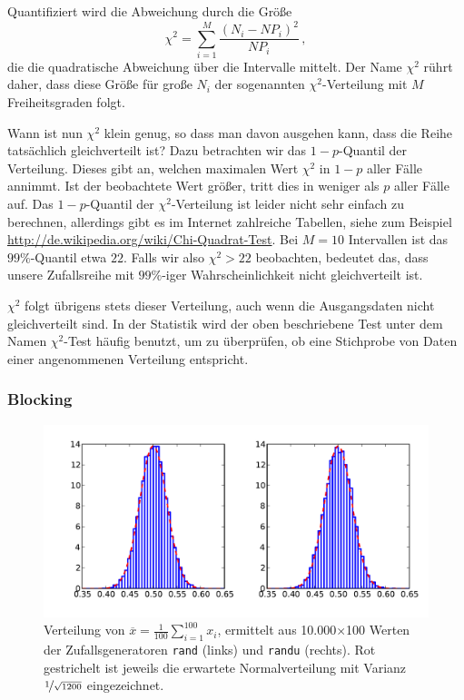 Quantifiziert wird die Abweichung durch die Größe
\begin{equation}
	\chi^2 = \sum_{i=1}^M\frac{(N_i - N P_i)^2}{N P_i}\,,
\end{equation}
die die quadratische Abweichung über die Intervalle mittelt. Der Name $\chi^2$ rührt daher, dass diese Größe für große $N_i$ der sogenannten $\chi^2$-Verteilung mit $M$ Freiheitsgraden folgt.

Wann ist nun $\chi^2$ klein genug, so dass man davon ausgehen kann, dass die Reihe tatsächlich gleichverteilt ist? Dazu betrachten wir das $1-p$-Quantil der Verteilung. Dieses gibt an, welchen maximalen Wert $\chi^2$ in $1-p$ aller Fälle annimmt. Ist der beobachtete Wert größer, tritt dies in weniger als $p$ aller Fälle auf. Das $1-p$-Quantil der $\chi^2$-Verteilung ist leider nicht sehr einfach zu berechnen, allerdings gibt es im Internet zahlreiche Tabellen, siehe zum Beispiel \url{http://de.wikipedia.org/wiki/Chi-Quadrat-Test}. Bei $M=10$ Intervallen ist das $99\%$-Quantil etwa $22$. Falls wir also $\chi^2>22$ beobachten, bedeutet das, dass unsere Zufallsreihe mit $99\%$-iger Wahrscheinlichkeit nicht gleichverteilt ist.

$\chi^2$ folgt übrigens stets dieser Verteilung, auch wenn die Ausgangsdaten nicht gleichverteilt sind. In der Statistik wird der oben beschriebene Test unter dem Namen $\chi^2$-Test häufig benutzt, um zu überprüfen, ob eine Stichprobe von Daten einer angenommenen Verteilung entspricht.

\subsubsection{Blocking}

\begin{figure}
  \centering
  \includegraphics[width=\textwidth]{plots/statistics_test}
  \caption{Verteilung von $\overline{x} = \frac{1}{100}\sum_{i=1}^{100} x_i$,
    ermittelt aus 10.000$\times$100 Werten der Zufallsgeneratoren
    \texttt{rand} (links) und \texttt{randu} (rechts). Rot
    gestrichelt ist jeweils die erwartete Normalverteilung mit Varianz
    $\nicefrac{1}{\sqrt{1200}}$ eingezeichnet.}
  \label{fig:statistics_test}
\end{figure}

